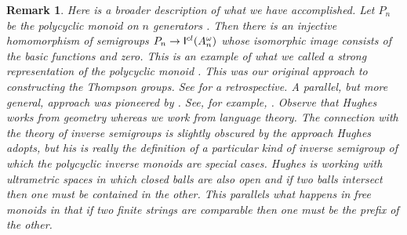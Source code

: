 \documentclass[a4paper]{amsart}
\newtheorem{remark}[theorem]{Remark}
\begin{document}
\begin{remark}{\em  Here is a broader description of what we have accomplished.
Let $P_{n}$ be the polycyclic monoid on $n$ generators \cite{Lawson1998}.
Then there is an injective homomorphism of semigroups
$P_{n} \rightarrow \mathsf{I}^{\tiny cl}(A_{n}^{\omega})$ whose isomorphic image consists of the basic functions and zero.
This is an example of what we called a {\em strong representation} of the polycyclic monoid \cite{Lawson2009}.
This was our original approach to constructing the Thompson groups.
See \cite{Lawson2021b} for a retrospective.
A parallel, but more general, approach was pioneered by \cite{Hughes}.
See, for example, \cite[Example 4.1]{Hughes}.
Observe that Hughes works from geometry whereas we work from language theory.
The connection with the theory of inverse semigroups is slightly obscured by the approach Hughes adopts,
but his \cite[Definition 3.1]{Hughes} is really the definition of a particular kind of inverse semigroup
of which the polycyclic inverse monoids are special cases.
Hughes is working with ultrametric spaces in which closed balls are also open
and if two balls intersect then one must be contained in the other.
This parallels what happens in free monoids in that if two finite strings 
are comparable then one must be the prefix of the other.}
\end{remark}
\end{document}
